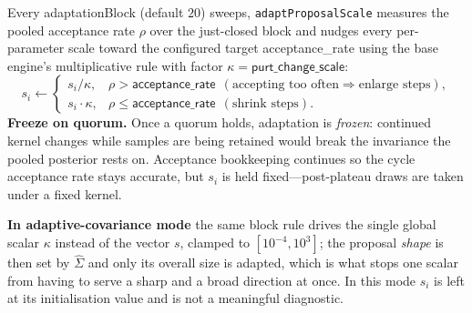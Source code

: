 \documentclass[11pt]{article}
\newcommand{\code}[1]{\texttt{\small #1}}
\newcommand{\param}[1]{\textsf{#1}}
\begin{document}
Every \param{adaptationBlock} (default $20$) sweeps, \code{adaptProposalScale}
measures the pooled acceptance rate $\rho$ over the just-closed block and
nudges every per-parameter scale toward the configured target
\param{acceptance\_rate} using the base engine's multiplicative rule with
factor $\kappa=\param{purt\_change\_scale}$:
\begin{equation}
  s_i \leftarrow
  \begin{cases}
    s_i/\kappa, & \rho > \param{acceptance\_rate}\ \ (\text{accepting too often}\Rightarrow\text{enlarge steps}),\\
    s_i\cdot\kappa, & \rho \le \param{acceptance\_rate}\ \ (\text{shrink steps}).
  \end{cases}
\end{equation}
\textbf{Freeze on quorum.} Once a quorum holds, adaptation is
\emph{frozen}: continued kernel changes while samples are being retained
would break the invariance the pooled posterior rests on. Acceptance
bookkeeping continues so the cycle acceptance rate stays accurate, but
$s_i$ is held fixed---post-plateau draws are taken under a fixed kernel.

\textbf{In adaptive-covariance mode} the same block rule drives the single
global scalar $\kappa$ instead of the vector $s$, clamped to
$[10^{-4},10^{3}]$; the proposal \emph{shape} is then set by $\hat\Sigma$
and only its overall size is adapted, which is what stops one scalar from
having to serve a sharp and a broad direction at once. In this mode $s_i$
is left at its initialisation value and is not a meaningful diagnostic.
\end{document}
